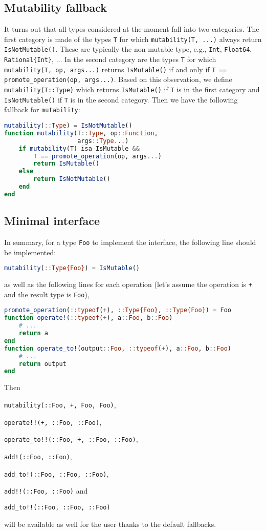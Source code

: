 \documentclass{juliacon}
\begin{document}
\subsection{Mutability fallback}
It turns out that all types considered at the moment fall into two categories.
The first category is made of the types \lstinline|T| for which
\lstinline|mutability(T, ...)| always return \lstinline|IsNotMutable()|.
These are typically the non-mutable type, e.g., \lstinline|Int|, \lstinline|Float64|, \lstinline|Rational{Int}|, ...
In the second category are the types \lstinline|T| for which
\lstinline|mutability(T, op, args...)| returns \lstinline|IsMutable()|
if and only if \lstinline|T == promote_operation(op, args...)|.
Based on this observation, we define \lstinline|mutability(T::Type)| which
returns \lstinline|IsMutable()| if \lstinline|T| is in the first category
and \lstinline|IsNotMutable()| if \lstinline|T| is in the second category.
Then we have the following fallback for \lstinline|mutability|:
\begin{lstlisting}[language = Julia]
mutability(::Type) = IsNotMutable()
function mutability(T::Type, op::Function,
                    args::Type...)
    if mutability(T) isa IsMutable &&
        T == promote_operation(op, args...)
        return IsMutable()
    else
        return IsNotMutable()
    end
end
\end{lstlisting}

\subsection{Minimal interface}
In summary, for a type \lstinline|Foo| to implement the interface,
the following line should be implemented:
\begin{lstlisting}[language = Julia]
mutability(::Type{Foo}) = IsMutable()
\end{lstlisting}
as well as the following lines for each operation
(let's assume the operation is \lstinline|+|
and the result type is \lstinline|Foo|),
\begin{lstlisting}[language = Julia]
promote_operation(::typeof(+), ::Type{Foo}, ::Type{Foo}) = Foo
function operate!(::typeof(+), a::Foo, b::Foo)
    # ...
    return a
end
function operate_to!(output::Foo, ::typeof(+), a::Foo, b::Foo)
    # ...
    return output
end
\end{lstlisting}
Then
\begin{unnumlist}
  \item \lstinline|mutability(::Foo, +, Foo, Foo)|,
  \item \lstinline|operate!!(+, ::Foo, ::Foo)|,
  \item \lstinline|operate_to!!(::Foo, +, ::Foo, ::Foo)|,
  \item \lstinline|add!(::Foo, ::Foo)|,
  \item \lstinline|add_to!(::Foo, ::Foo, ::Foo)|,
  \item \lstinline|add!!(::Foo, ::Foo)| and
  \item \lstinline|add_to!!(::Foo, ::Foo, ::Foo)|
\end{unnumlist}
will be available as well for the user thanks to the default fallbacks.
\end{document}
